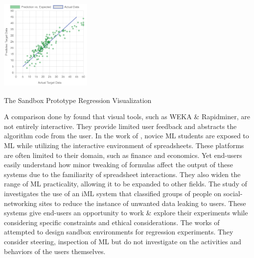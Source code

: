 \documentclass{sigchi-ext}
\begin{document}
\begin{marginfigure}[1.5pc]
\begin{minipage}{\marginparwidth}
     \centering
    \includegraphics[width=4.5cm,height=4.5cm]{figures/Reg_Vis.png}
    \caption{The Sandbox Prototype Regression Visualization}
    \label{fig:Code_viz}
    \end{minipage}
\end{marginfigure}

A comparison done by \cite{nodalo2019building} found that visual tools, such as WEKA \& Rapidminer, are not entirely interactive. They provide limited user feedback and abstracts the algorithm code from the user. In the work of \cite{sarkar2015interactive}, novice ML students are exposed to ML while utilizing the interactive environment of spreadsheets. These platforms are often limited to their domain, such as finance and economics. Yet end-users easily understand how minor tweaking of formulas affect the output of these systems due to the familiarity of spreadsheet interactions. They also widen the range of ML practicality, allowing it to be expanded to other fields. The study of \cite{amershi2011designing,amershi2012regroup} investigates the use of an iML system that classified groups of people on social-networking sites to reduce the instance of unwanted data leaking to users. These systems give end-users an opportunity to work \& explore their experiments while considering specific constraints and ethical considerations. The works of \cite{das2019beames, zhao2019featureexplorer} attempted to design sandbox environments for regression experiments. They consider steering, inspection of ML but do not investigate on the activities and behaviors of the users themselves.
\end{document}
